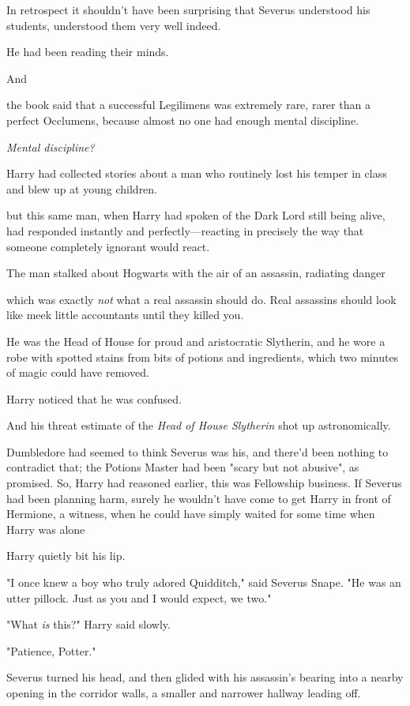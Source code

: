 In retrospect it shouldn't have been surprising that Severus understood his
students, understood them very well indeed.

He had been reading their minds.

And{\el}

{\el} the book said that a successful Legilimens was extremely rare, rarer
than a perfect Occlumens, because almost no one had enough mental discipline.

\emph{Mental discipline?}

Harry had collected stories about a man who routinely lost his temper in class
and blew up at young children.

{\el} but this same man, when Harry had spoken of the Dark Lord still being
alive, had responded instantly and perfectly---reacting in precisely the way
that someone completely ignorant would react.

The man stalked about Hogwarts with the air of an assassin, radiating
danger{\el}

{\el} which was exactly \emph{not} what a real assassin should do. Real
assassins should look like meek little accountants until they killed you.

He was the Head of House for proud and aristocratic Slytherin, and he wore a
robe with spotted stains from bits of potions and ingredients, which two
minutes of magic could have removed.

Harry noticed that he was confused.

And his threat estimate of the \emph{Head of House Slytherin} shot up
astronomically.

Dumbledore had seemed to think Severus was his, and there'd been nothing to
contradict that; the Potions Master had been "scary but not abusive", as
promised. So, Harry had reasoned earlier, this was Fellowship business. If
Severus had been planning harm, surely he wouldn't have come to get Harry in
front of Hermione, a witness, when he could have simply waited for some time
when Harry was alone{\el}

Harry quietly bit his lip.

"I once knew a boy who truly adored Quidditch," said Severus Snape. "He was an
utter pillock. Just as you and I would expect, we two."

"What \emph{is} this?" Harry said slowly.

"Patience, Potter."

Severus turned his head, and then glided with his assassin's bearing into a
nearby opening in the corridor walls, a smaller and narrower hallway leading
off.

